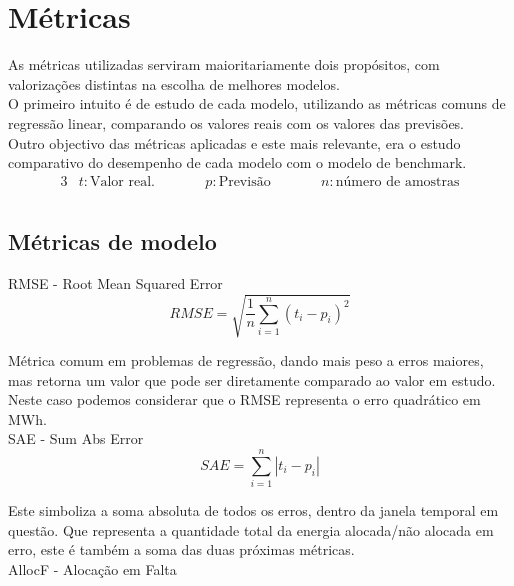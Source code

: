 \chapter{Métricas}

As métricas utilizadas serviram maioritariamente dois propósitos, com valorizações distintas na escolha de melhores modelos. \\
O primeiro intuito é de estudo de cada modelo, utilizando as métricas comuns de regressão linear, comparando os valores reais com os valores das previsões.\\
Outro objectivo das métricas aplicadas e este mais relevante, era o estudo comparativo do desempenho de cada modelo com o modelo de benchmark.\\

\begin{alignat*}{3} 
& t : \text{Valor real.} &\qquad& p : \text{Previsão} &\qquad& n : \text{número de amostras} \\
\end{alignat*}


\section{Métricas de modelo}

\bigskip
RMSE - Root Mean Squared Error \\

\begin{equation} \label{eq:rmse} 
    RMSE = \sqrt{\frac{1}{n} \sum_{i=1}^{n}(t_i - p_i)^2} 
\end{equation}
\smallskip

Métrica comum em problemas de regressão, dando mais peso a erros maiores, mas retorna um valor que pode ser diretamente comparado ao valor em estudo. Neste caso podemos considerar que o RMSE representa o erro quadrático em MWh. \\
\bigskip
SAE - Sum Abs Error \\


\begin{equation} \label{eq:sae} 
    SAE = \sum_{i=1}^{n}\left|t_i - p_i \right|
\end{equation}
\smallskip

Este simboliza a soma absoluta de todos os erros, dentro da janela temporal em questão. Que representa a quantidade total da energia alocada/não alocada em erro, este é também a soma das duas próximas métricas.\\
\bigskip
AllocF - Alocação em Falta \\

